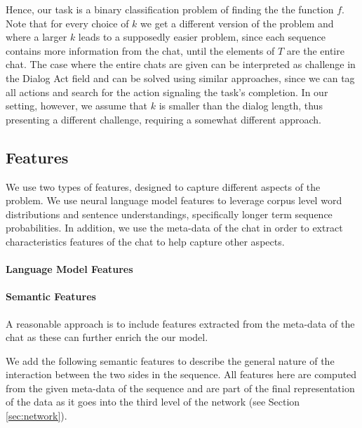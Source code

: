 Hence, our task is a binary classification 
problem of finding the the function $f$.  
Note that for every choice of $k$ we get a different 
version of the problem and where a larger $k$ leads 
to a supposedly easier problem, since each sequence contains 
more information from the chat, until the elements of $T$ 
are the entire chat. The case where the entire chats are 
given can be interpreted as challenge in the Dialog Act \cite{cs-CL-0006023,DBLP:conf/icassp/JiB05,DBLP:conf/coling/WermterL96}
field and can be solved using similar approaches, since we 
can tag all actions and search for the action signaling the task's completion. 
In our setting, however, we assume that $k$ is smaller than the dialog 
length, thus presenting a different challenge, requiring a somewhat different approach. 

\subsection{Features}
We use two types of features, designed to capture
different aspects of the problem. We use neural 
language model features to leverage corpus
level word distributions and sentence understandings, 
specifically longer term
sequence probabilities. In addition, we use the meta-data of the chat in order to extract characteristics features of the chat 
to help capture other aspects.

\paragraph*{Language Model Features}

\paragraph*{Semantic Features}\label{sec:semantic}
A reasonable approach is to include features 
extracted from the meta-data of the chat as 
these can further enrich the our model. 

We add the following semantic features 
to describe the general nature 
of the interaction between the two sides 
in the sequence. All features here 
are computed from the given meta-data of the sequence and 
are part of the final representation of the data as it goes into the 
third level of the network (see Section \ref{sec:network}). 

